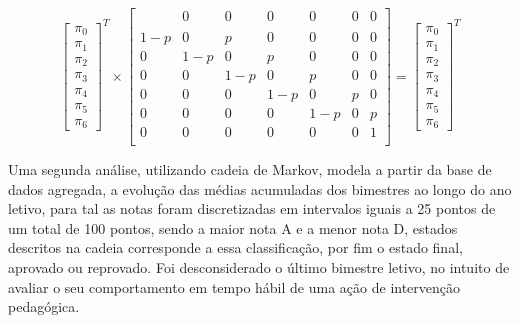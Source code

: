 \documentclass{article}
\begin{document}
\[
\begin{bmatrix}
\pi_{0} \\
\pi_{1} \\
\pi_{2} \\
\pi_{3} \\
\pi_{4} \\
\pi_{5} \\
\pi_{6}
\end{bmatrix}^T \times
\begin{bmatrix}
    \frac{}{}   & 0 & 0 & 0 & 0 & 0 & 0 \\
    1-p & 0 & p & 0 & 0 & 0 & 0 \\
    0 & 1-p & 0 & p & 0 & 0 & 0 \\
    0 & 0 & 1-p & 0 & p & 0 & 0 \\
    0 & 0 & 0 & 1-p & 0 & p & 0 \\
    0 & 0 & 0 & 0 & 1-p & 0 & p \\
    0 & 0 & 0 & 0 & 0 & 0 &   1 \\
\end{bmatrix} =
\begin{bmatrix}
\pi_{0} \\
\pi_{1} \\
\pi_{2} \\
\pi_{3} \\
\pi_{4} \\
\pi_{5} \\
\pi_{6}
\end{bmatrix}^T
\]

Uma segunda análise, utilizando cadeia de Markov, modela a partir da base de dados agregada, a evolução das médias acumuladas dos bimestres ao longo do ano letivo, para tal as notas foram discretizadas em intervalos iguais a 25 pontos de um total de 100 pontos, sendo a maior nota A e a menor nota D, estados descritos na cadeia corresponde a essa classificação, por fim o estado final, aprovado ou reprovado.  Foi desconsiderado o último bimestre letivo, no intuito de avaliar o seu comportamento em tempo hábil de uma ação de intervenção pedagógica.
\end{document}

